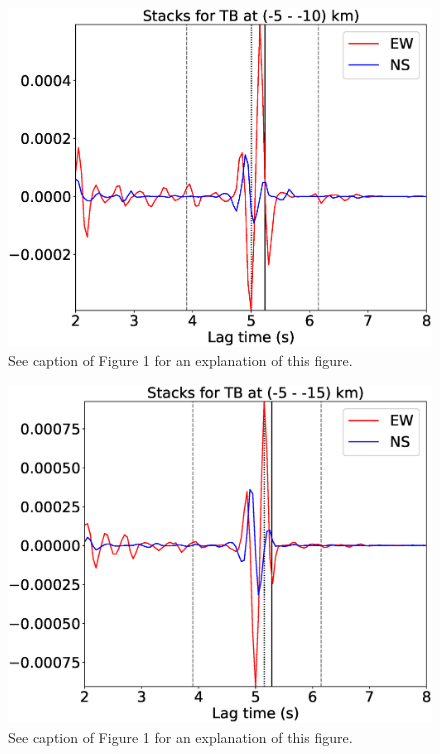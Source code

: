 \documentclass[letterpaper, 12pt]{article}
\begin{document}
\begin{figure}[H]
\includegraphics[width=\linewidth]{figures/intervals/TB_-05_-10_stacks.eps}
\caption{See caption of Figure 1 for an explanation of this figure.}
\end{figure}

\begin{figure}[H]
\includegraphics[width=\linewidth]{figures/intervals/TB_-05_-15_stacks.eps}
\caption{See caption of Figure 1 for an explanation of this figure.}
\end{figure}
\end{document}

